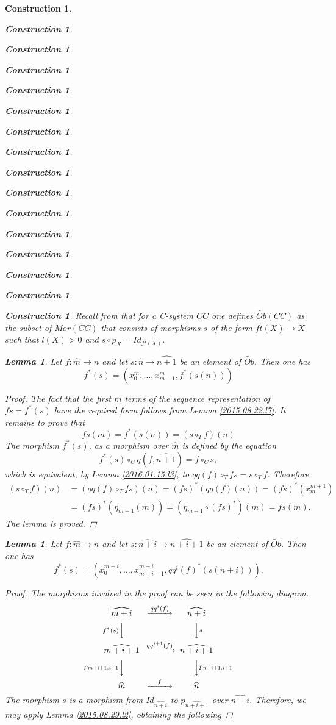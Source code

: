 \documentclass[onecolumn,12pt]{amsart}
\newtheorem{lemma}[proposition]{Lemma}
\numberwithin{proposition}{subsection}
\newtheorem{construction}[proposition]{Construction}
\newcommand{\sr}{\rightarrow}
\newcommand{\wt}{\widetilde}
\newcommand{\wh}{\widehat}
\newcommand{\mbind}[1]{{#1^*}}
\newcommand{\hc}{\circ_{T}}
\begin{document}
\begin{construction}
\begin{construction}
\begin{construction}
\begin{construction}
\begin{construction}
\begin{construction}
\begin{construction}
\begin{construction}
\begin{construction}
\begin{construction}
\begin{construction}
\begin{construction}
\begin{construction}
\begin{construction}
\begin{construction}
\begin{construction}
Recall from \cite{Csubsystems} that for a C-system $CC$ one defines
$\wt{Ob}(CC)$ as the subset of $Mor(CC)$ that consists of morphisms $s$ of the
form $ft(X)\sr X$ such that $l(X)>0$ and $s\circ p_X=Id_{ft(X)}$.
%
\begin{lemma}
\label{2015.08.24.l1}
Let $f:\wh{m}\sr\wh{n}$ and let $s:\wh{n}\sr\wh{n+1}$ be an element of $\wt{Ob}$. Then one has
%
$$f^*(s)=(x_0^m,\dots,x_{m-1}^m,\mbind{f}(s(n)))$$
%
\end{lemma}
%
\begin{proof}
The fact that the first $m$ terms of the sequence representation of $fs=f^*(s)$
have the required form follows from Lemma \ref{2015.08.22.l7}. It remains to
prove that
%
$$fs(m)=\mbind{f}(s(n))=(s\hc f)(n)$$
%
The morphism $f^*(s)$, as a morphism over $\wh{m}$ is defined by the equation
%
$$f^*(s)\circ_C q(f,\wh{n+1})=f\circ_C s,$$
%
which is equivalent, by Lemma \ref{2016.01.15.l3},  to $qq(f)\hc fs=s\hc f$. Therefore 
%
\begin{equation*}
  \begin{split}
    (s\hc f)(n)&=(qq(f)\hc fs)(n)=\mbind{(fs)}(qq(f)(n))=\mbind{(fs)}(x_m^{m+1})
    \\&
    = \mbind{(fs)}(\eta_{m+1}(m))
    = (\eta_{m+1}\circ\mbind{(fs)})(m)=fs(m).
  \end{split}
\end{equation*}
%
The lemma is proved.
\end{proof}
%
\begin{lemma}
\label{2015.08.29.l1}
Let $f:\wh{m}\sr\wh{n}$ and let $s:\wh{n+i}\sr\wh{n+i+1}$ be an element of $\wt{Ob}$. Then one has
%
\begin{equation}\label{2015.08.29.eq1}
f^*(s)=(x_0^{m+i},\dots,x_{m+i-1}^{m+i},\mbind{qq^i(f)}(s(n+i))).
\end{equation}%
%
\end{lemma}
%
\begin{proof}
The morphisms involved in the proof can be seen in the following diagram.
%
$$
\begin{CD}
\wh{m+i} @>qq^i(f)>> \wh{n+i}\\
@Vf^*(s)VV @VVsV\\
\wh{m+i+1} @>qq^{i+1}(f)>> \wh{n+i+1}\\
@Vp_{m+i+1,i+1}VV @VVp_{n+i+1,i+1}V\\
\wh{m} @>f>> \wh{n}
\end{CD}
$$
%
The morphism $s$ is a morphism from $Id_{\wh{n+i}}$ to $p_{\wh{n+i+1}}$ over
$\wh{n+i}$. Therefore, we may apply Lemma \ref{2015.08.29.l2}, obtaining the following

\end{proof}
\end{construction}
\end{construction}
\end{construction}
\end{construction}
\end{construction}
\end{construction}
\end{construction}
\end{construction}
\end{construction}
\end{construction}
\end{construction}
\end{construction}
\end{construction}
\end{construction}
\end{construction}
\end{construction}
\end{document}
